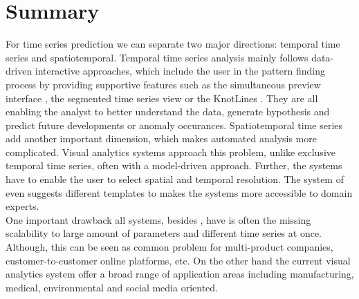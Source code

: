 \documentclass[electronic]{vgtc}             %
\begin{document}
\section{Summary}
For time series prediction we can separate two major directions: temporal time series and spatiotemporal.
Temporal time series analysis mainly follows data-driven interactive approaches, which include the user in the pattern finding process by providing supportive features such as the simultaneous preview interface \cite{buono:2007}, the segmented time series view \cite{steed:2017} or the KnotLines \cite{Xie:2014}.
They are all enabling the analyst to better understand the data, generate hypothesis and predict future developments or anomaly occurances.
Spatiotemporal time series add another important dimension, which makes automated analysis more complicated. 
Visual analytics systems approach this problem, unlike exclusive temporal time series, often with a model-driven approach. 
Further, the systems have to enable the user to select spatial and temporal resolution.
The system of \cite{malik:2014} even suggests different templates to makes the systems more accessible to domain experts.\\
One important drawback all systems, besides \cite{steed:2017,McLachlan:2008}, have is often the missing scalability to large amount of parameters and different time series at once. 
Although, this can be seen as common problem for multi-product companies, customer-to-customer online platforms, etc.
On the other hand the current visual analytics system offer a broad range of application areas including manufacturing, medical, environmental and social media oriented. 

%
%
%

%


\end{document}
